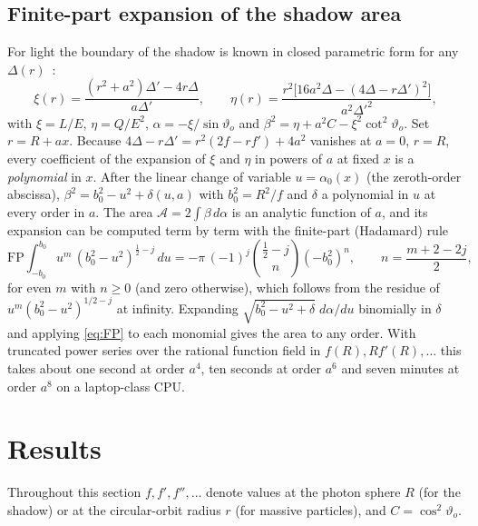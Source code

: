 \documentclass[11pt,a4paper]{article}
\theoremstyle{remark}
\numberwithin{equation}{section}
\begin{document}
\subsection{Finite-part expansion of the shadow area}\label{sec:fp}
For light the boundary of the shadow is known in closed parametric form for any
$\Delta(r)$~\cite{Tsukamoto2018}:
\begin{equation}
\xi(r)=\frac{(r^2+a^2)\Delta'-4r\Delta}{a\Delta'},\qquad
\eta(r)=\frac{r^2\big[16a^2\Delta-(4\Delta-r\Delta')^2\big]}{a^2\Delta'^2},
\label{eq:xieta}
\end{equation}
with $\xi=L/E$, $\eta=Q/E^2$, $\alpha=-\xi/\sin\vartheta_o$ and
$\beta^2=\eta+a^2C-\xi^2\cot^2\vartheta_o$. Set $r=R+a x$. Because $4\Delta-r\Delta'=r^2(2f-rf')+4a^2$
vanishes at $a=0$, $r=R$, every coefficient of the expansion of $\xi$ and $\eta$ in powers of $a$ at
fixed $x$ is a \emph{polynomial} in $x$. After the linear change of variable $u=\alpha_0(x)$
(the zeroth-order abscissa), $\beta^2=b_0^2-u^2+\delta(u,a)$ with $b_0^2=R^2/f$ and $\delta$ a
polynomial in $u$ at every order in $a$. The area
$\mathcal A=2\int\beta\,d\alpha$ is an analytic function of $a$, and its expansion can be computed term by term
with the finite-part (Hadamard) rule
\begin{equation}
\mathrm{FP}\!\int_{-b_0}^{b_0}u^m\,(b_0^2-u^2)^{\frac12-j}\,du
=-\pi\,(-1)^j\binom{\frac12-j}{n}(-b_0^2)^n,\qquad n=\frac{m+2-2j}{2},
\label{eq:FP}
\end{equation}
for even $m$ with $n\ge0$ (and zero otherwise), which follows from the residue of
$u^{m}(b_0^2-u^2)^{1/2-j}$ at infinity. Expanding $\sqrt{b_0^2-u^2+\delta}\;d\alpha/du$ binomially in
$\delta$ and applying \eqref{eq:FP} to each monomial gives the area to any order. With truncated power
series over the rational function field in $f(R),R f'(R),\dots$ this takes about one second at
order $a^4$, ten seconds at order $a^6$ and seven minutes at order $a^8$ on a laptop-class CPU.

\section{Results}\label{sec:results}

Throughout this section $f,f',f'',\dots$ denote values at the photon sphere $R$ (for the shadow) or at
the circular-orbit radius $r$ (for massive particles), and $C=\cos^2\vartheta_o$.
\end{document}
